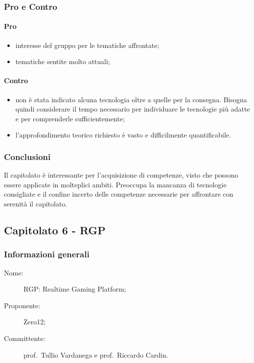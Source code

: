 \subsubsection{Pro e Contro}
\paragraph*{Pro}
\begin{itemize}
	\item interesse del gruppo per le tematiche affrontate;
	\item tematiche sentite molto attuali;
\end{itemize}
\paragraph*{Contro}
\begin{itemize}
	\item non è stata indicato alcuna tecnologia oltre a quelle per la consegna. Bisogna quindi considerare il tempo necessario per individuare le tecnologie più adatte e per comprenderle sufficientemente;
	\item l'approfondimento teorico richiesto è vasto e difficilmente quantificabile.
\end{itemize}
\subsubsection{Conclusioni}
Il capitolato è interessante per l'acquisizione di competenze, visto che possono essere applicate in molteplici ambiti. Preoccupa la mancanza di tecnologie consigliate e il confine incerto delle competenze necessarie per affrontare con serenità il capitolato.

\subsection{Capitolato 6 - RGP}
\subsubsection{Informazioni generali}
\begin{description}
	\item[Nome:] RGP: Realtime Gaming Platform;
	\item[Proponente:] Zero12;
	\item[Committente:] prof.~Tullio Vardanega e prof.~Riccardo Cardin.
\end{description}
